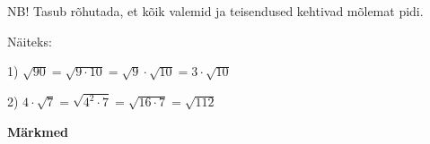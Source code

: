 \begin{center}
{{{\begin{flushleft}
\hspace{5mm}
NB! Tasub rõhutada, et kõik valemid ja teisendused kehtivad mõlemat pidi.

\vspace{2mm}
\hspace{5mm}
Näiteks:

\vspace{2mm}
\hspace{5mm}
1)  $\sqrt{90}=\sqrt{9 \cdot 10}=\sqrt{9} \cdot \sqrt{10}=3\cdot \sqrt{10}$

\vspace{2mm}
\hspace{5mm}
2) $4\cdot \sqrt{7}=\sqrt{4^{2} \cdot 7}=\sqrt{16 \cdot 7}= \sqrt{112}$


\end{flushleft}
}}}
\end{center}
\vspace{0.5cm}

\textbf{Märkmed}\\
\vspace{2mm}
\begin{mdframed}[style=graphpaper]
\vspace{6cm}
\end{mdframed}